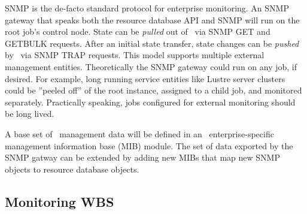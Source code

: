 SNMP\cite{StallingsSNMP} is the de-facto standard protocol for enterprise
monitoring.  An SNMP gateway that speaks both the resource database API
and SNMP will run on the root job's control node.
State can be {\em pulled} out of \ngrm\ via SNMP GET and GETBULK requests.
After an initial state transfer, state changes can be {\em pushed}
by \ngrm\ via SNMP TRAP requests.  This model supports multiple external
management entities.
Theoretically the SNMP gateway could run on any job, if desired.
For example, long running service entities like Lustre server clusters
could be ''peeled off'' of the root instance, assigned to a child job,
and monitored separately.
Practically speaking, jobs configured for external monitoring should be
long lived.

A base set of \ngrm\ management data will be defined in an \ngrm\ 
enterprise-specific management information base (MIB) module.
The set of data exported by the SNMP gatway can be extended by adding
new MIBs that map new SNMP objects to resource database objects.

\ifwbs
\subsection{Monitoring WBS}

